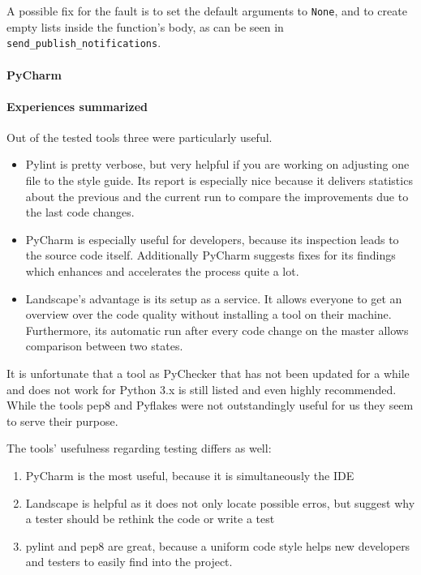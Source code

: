 A possible fix for the fault is to set the default arguments to \texttt{None}, and to create empty lists inside the function's body, as can be seen in \texttt{send\_publish\_notifications}.

\paragraph{PyCharm}

\paragraph{Experiences summarized}
Out of the tested tools three were particularly useful.

\begin{itemize}
    \item Pylint is pretty verbose, but very helpful if you are working on adjusting one file to the style guide.
    Its report is especially nice because it delivers statistics about the previous and the current run to compare the improvements due to the last code changes.
    \item PyCharm is especially useful for developers, because its inspection leads to the source code itself.
    Additionally PyCharm suggests fixes for its findings which enhances and accelerates the process quite a lot.
    \item Landscape's advantage is its setup as a service. It allows everyone to get an overview over the code quality without installing a tool on their machine. Furthermore, its automatic run after every code change on the master allows comparison between two states.
\end{itemize}

It is unfortunate that a tool as PyChecker that has not been updated for a while and does not work for Python 3.x is still listed and even highly recommended.  
While the tools pep8 and Pyflakes were not outstandingly useful for us they seem to serve their purpose.

The tools' usefulness regarding testing differs as well:
\begin{enumerate}
    \item PyCharm is the most useful, because it is simultaneously the IDE
    \item Landscape is helpful as it does not only locate possible erros, but suggest why a tester should be rethink the code or write a test 
    \item pylint and pep8 are great, because a uniform code style helps new developers and testers to easily find into the project. 
\end{enumerate}






